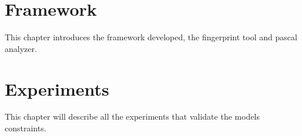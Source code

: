 \documentclass{report}
\begin{document}
\chapter{Framework}
This chapter introduces the framework developed, the fingerprint tool and pascal analyzer.



\chapter{Experiments}
This chapter will describe all the experiments that validate the models constraints.






\end{document}
